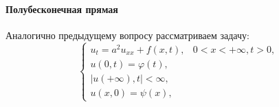 

\paragraph{Полубесконечная прямая}
Аналогично предыдущему вопросу рассматриваем задачу:
\begin{equation}\label{1.10.2-main}
  \begin{cases}
    u_t = a^2 u_{xx} + f(x, t), &0 < x < +\infty, t > 0, \\
    u(0, t) = \varphi(t), \\
    |u(+\infty), t| < \infty, \\
    u(x, 0) = \psi(x),
  \end{cases}
\end{equation}


